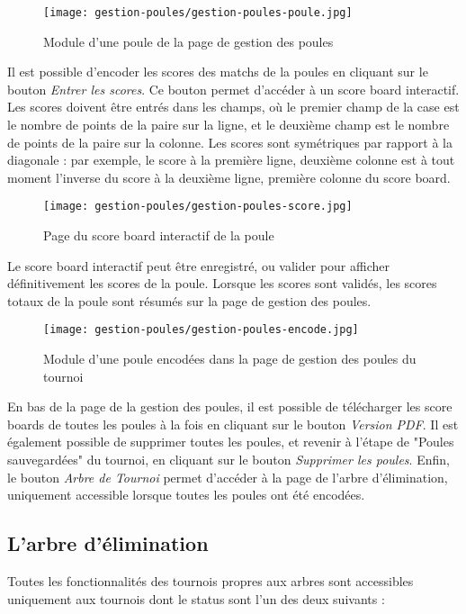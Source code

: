 \begin{figure}[H]
\centering
\texttt{[image: gestion-poules/gestion-poules-poule.jpg]}
\caption{Module d'une poule de la page de gestion des poules}
\end{figure}

Il est possible d'encoder les scores des matchs de la poules en cliquant sur le bouton \textit{Entrer les scores}. Ce bouton permet d'accéder à un score board interactif. Les scores doivent être entrés dans les champs, où le premier champ de la case est le nombre de points de la paire sur la ligne, et le deuxième champ est le nombre de points de la paire sur la colonne. Les scores sont symétriques par rapport à la diagonale : par exemple, le score à la première ligne, deuxième colonne est à tout moment l'inverse du score à la deuxième ligne, première colonne du score board.

\begin{figure}[H]
\centering
\texttt{[image: gestion-poules/gestion-poules-score.jpg]}
\caption{Page du score board interactif de la poule}
\end{figure}

Le score board interactif peut être enregistré, ou valider pour afficher définitivement les scores de la poule. Lorsque les scores sont validés, les scores totaux de la poule sont résumés sur la page de gestion des poules.

\begin{figure}[H]
\centering
\texttt{[image: gestion-poules/gestion-poules-encode.jpg]}
\caption{Module d'une poule encodées dans la page de gestion des poules du tournoi}
\end{figure}

En bas de la page de la gestion des poules, il est possible de télécharger les score boards de toutes les poules à la fois en cliquant sur le bouton \textit{Version PDF}. Il est également possible de supprimer toutes les poules, et revenir à l'étape de "Poules sauvegardées" du tournoi, en cliquant sur le bouton \textit{Supprimer les poules}. Enfin, le bouton \textit{Arbre de Tournoi} permet d'accéder à la page de l'arbre d'élimination, uniquement accessible lorsque toutes les poules ont été encodées.

\subsection{L'arbre d'élimination}

Toutes les fonctionnalités des tournois propres aux arbres sont accessibles uniquement aux tournois dont le status sont l'un des deux suivants :

